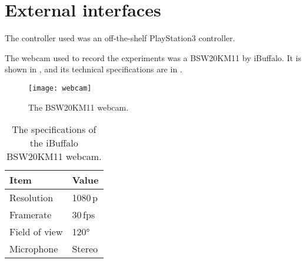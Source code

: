 \section{External interfaces}
The controller used was an off-the-shelf PlayStation3 controller.

The webcam used to record the experiments was a BSW20KM11 by iBuffalo.
It is shown in , and its technical specifications are in .

\begin{figure}[h]
  \centering
  \texttt{[image: webcam]}
  \caption[Webcam]{The BSW20KM11 webcam.}
  \label{fig:webcam}
\end{figure}

\begin{table}[h]
  \centering
  \caption[Webcam specifications]{The specifications of the iBuffalo BSW20KM11 webcam.}
  \begin{tabular}{ll}
    \toprule
    Item & Value \\
    \midrule
    Resolution & 1080\,p\\
    Framerate & 30\,fps\\
    Field of view & 120°\\
    Microphone & Stereo \\
    \bottomrule
  \end{tabular}
  \label{tab:webcam_specs}
\end{table}
